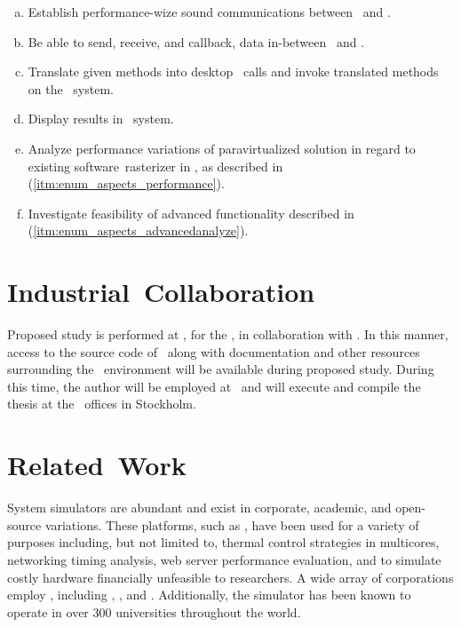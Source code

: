 \newcommand*\objective[1]{\item}%
\begin{multicols}{2}
\begin{enumerate}[(a)]
	\objective{1} Establish performance-wize sound communications between \termhost\ and \termtarget .
	\objective{2} Be able to send, receive, and callback, data in-between \termhost\ and \termtarget .
	\objective{3} Translate given methods into desktop \termapi\ calls and invoke translated methods on the \termhost\ system.
	\objective{4} Display results in \termtarget\ system.
	\objective{5} Analyze performance variations of paravirtualized solution in regard to existing software~rasterizer in \termsimics , as described in (\ref{itm:enum_aspects_performance}).
	\objective{6} Investigate feasibility of advanced functionality described in (\ref{itm:enum_aspects_advancedanalyze}).
\end{enumerate}
\end{multicols}

\section{Industrial~Collaboration}
\label{sec:aimandobjectives_industrialcollaboration}
Proposed study is performed at \termbth , for the \termbthdept , in collaboration with \termintel .
In this manner, access to the source code of \termsimics\ along with documentation and other resources surrounding the \termsimics\ environment will be available during proposed study.
During this time, the author will be employed at \termintel\ and will execute and compile the thesis at the \termintel\ offices in Stockholm.

\section{Related~Work}
\label{sec:aimandobjectives_relatedwork}
System simulators are abundant and exist in corporate, academic, and open-source variations.
These platforms, such as \termsimics , have been used for a variety of purposes including, but not limited to, thermal control strategies in multicores, networking timing analysis, web server performance evaluation, and to simulate costly hardware financially unfeasible to researchers.
A wide array of corporations employ \termsimics , including \termibm {}, \termintel {}, and \termnasa {}.
Additionally, the simulator has been known to operate in over $300$ universities throughout the world.\\

